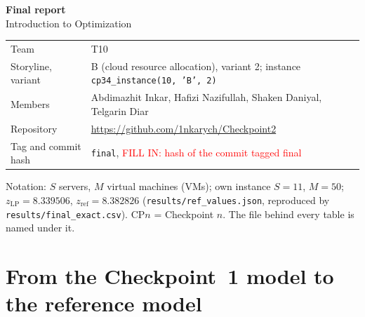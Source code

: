\documentclass[11pt,a4paper]{article}
\newcommand{\commithash}{\textcolor{red}{FILL IN: hash of the commit tagged final}}
\newcommand{\zref}{z_{\mathrm{ref}}}
\newcommand{\zLP}{z_{\mathrm{LP}}}
\begin{document}
\sloppy

\begin{center}
{\LARGE\bfseries Final report}\\[4pt]
{\large Introduction to Optimization}
\end{center}

\begin{tabularx}{\textwidth}{@{}lX@{}}
\toprule
Team & T10 \\
Storyline, variant & B (cloud resource allocation), variant 2; instance \texttt{cp34\_instance(10, 'B', 2)} \\
Members & Abdimazhit Inkar, Hafizi Nazifullah, Shaken Daniyal, Telgarin Diar \\
Repository & \url{https://github.com/1nkarych/Checkpoint2} \\
Tag and commit hash & \texttt{final}, \commithash \\
\bottomrule
\end{tabularx}

Notation: $S$ servers, $M$ virtual machines (VMs); own instance $S=11$, $M=50$; $\zLP=8.339506$, $\zref=8.382826$ (\texttt{results/ref\_values.json}, reproduced by \texttt{results/final\_exact.csv}). CP$n$ = Checkpoint $n$. The file behind every table is named under it.

\section{From the Checkpoint~1 model to the reference model}
\end{document}

